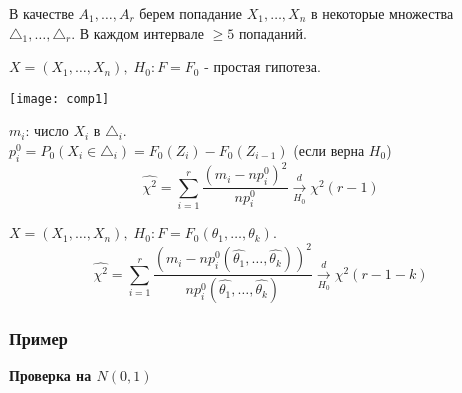 В качестве $A_1, \dots, A_r$ берем попадание $X_1, \dots, X_n$ в некоторые множества $\triangle_1, \dots, \triangle_r$. В каждом интервале $\ge 5$ попаданий.

\begin{example}\label{lec:comp/example:1}
	$X = (X_1, \dots, X_n), \; H_0: F = F_0$ - простая гипотеза.
	\begin{center}
		\texttt{[image: comp1]}
	\end{center}

	$m_i$: число $X_i$ в $\triangle_i$.\\
	$p_i^0 = P_0 (X_i \in \triangle_i) = F_0 (Z_i) - F_0 (Z_{i-1})$ (если верна $H_0$)\\
	$$\hat{\chi^2} = \underset{i=1}{\overset{r}{\sum}}\frac{(m_i - n p_i^0)^2}{n p_i^0} \xrightarrow[H_0]{d}\chi^2 (r-1)$$
\end{example}
\begin{example}\label{lec:comp/example:2}
	$X = (X_1, \dots, X_n), \; H_0: F = F_0 (\theta_1, \dots, \theta_k)$.
	$$\hat{\chi^2} = \underset{i=1}{\overset{r}{\sum}}\frac{\left( m_i - n p_i^0 (\hat{\theta_1}, \dots, \hat{\theta_k}) \right)^2}{n p_i^0 (\hat{\theta_1}, \dots, \hat{\theta_k})} \xrightarrow[H_0]{d} \chi^2 (r-1-k)$$
\end{example}

\subsubsection*{Пример}\label{cha:compl/sec:nenorm/subsec:pirson/subsubsection:prob}

\textbf{Проверка на $N(0,1)$}

